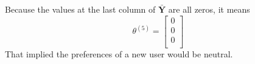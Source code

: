\begin{itemize}
    Because the values at the last column of $\bar{\mathbf{Y}}$ are all zeros, it means 
    \begin{equation}
        \theta^{(5)} = \left[\begin{array}{c} 0 \\ 0 \\ 0 \\\end{array}\right]
    \end{equation}
    That implied the preferences of a new user would be neutral.

\end{itemize}


